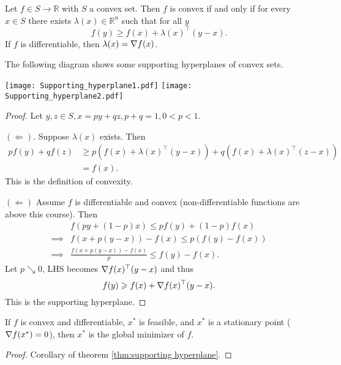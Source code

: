 \begin{theorem}\label{thm:supporting hyperplane}
    Let $f\in S\to \mathbb{R}$ with $S$ a convex set. Then $f$ is convex if and only if for every $x\in S$ there exists $ \lambda(x)\in \mathbb{R}^{n} $ such that for all $y$
    \[
        f(y)\ge f(x) + \lambda(x)^\top (y-x). 
    \]
    If $f$ is differentiable, then $\lambda(x) = \nabla f(x)$.
\end{theorem}
The following diagram shows some supporting hyperplanes of convex sets. 
\begin{center}
    \texttt{[image: Supporting\_hyperplane1.pdf]}
    \texttt{[image: Supporting\_hyperplane2.pdf]}
\end{center}
\begin{proof}
    Let $ y,z\in S, x = py + qz, p+q=1, 0<p<1 $.

    $ ( \Leftarrow ) $. Suppose $ \lambda(x) $ exists. Then 
    \begin{align*}
        p f(y) + q f(z) &\ge p(f(x)+\lambda(x)^\top(y-x)) + q (f(x)+ \lambda(x)^\top (z-x))\\
        &= f(x). 
    \end{align*}
    This is the definition of convexity. 

    $ ( \Leftarrow) $ Assume $f$ is differentiable and convex (non-differentiable functions are above this course). Then 
    \begin{align*}
        & f(py+(1-p)x) \le pf(y) + (1-p)f(x)\\
        \implies & f(x+p(y-x)) -f(x) \le p(f(y)-f(x))\\ 
        \implies & \frac{f(x+p(y-x))-f(x)}{p} \le f(y)-f(x).
    \end{align*}
    Let $p\searrow 0$, LHS becomes $ \nabla f(x)^\top (y-x) $ and thus
    \[
        f(y)\geqslant f(x) + \nabla f(x)^\top (y-x).
    \]
    This is the supporting hyperplane.
\end{proof}
\begin{theorem}
    If $f$ is convex and differentiable, $x^*$ is feasible, and $x^*$ is a stationary point ($ \nabla f(x^*) = 0 $), then $x^*$ is the global minimizer of $f$.
\end{theorem}
\begin{proof}
    Corollary of theorem \ref{thm:supporting hyperplane}.
\end{proof}

